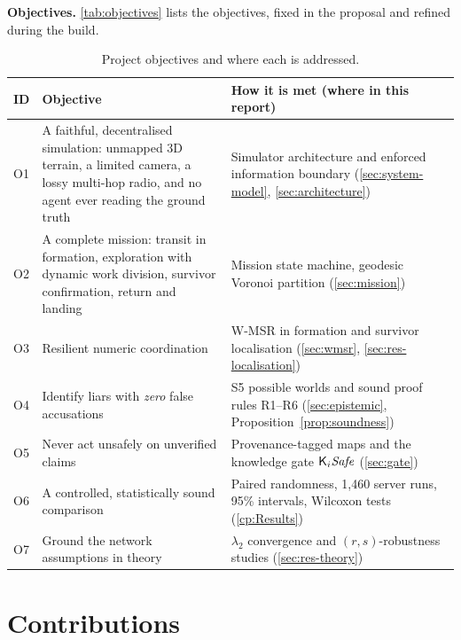 \textbf{Objectives.} \autoref{tab:objectives} lists the objectives, fixed in the proposal and refined during the build.

\begin{table}[h]
\centering
\renewcommand{\arraystretch}{1.25}
\begin{tabularx}{\linewidth}{@{}l X X@{}}
\toprule
\textbf{ID} & \textbf{Objective} & \textbf{How it is met (where in this report)} \\
\midrule
O1 & A faithful, decentralised simulation: unmapped 3D terrain, a limited camera, a lossy multi-hop radio, and no
     agent ever reading the ground truth & Simulator architecture and enforced information boundary
     (\autoref{sec:system-model}, \autoref{sec:architecture}) \\
O2 & A complete mission: transit in formation, exploration with dynamic work division, survivor confirmation, return
     and landing & Mission state machine, geodesic Voronoi partition (\autoref{sec:mission}) \\
O3 & Resilient numeric coordination & W-MSR in formation and survivor localisation
     (\autoref{sec:wmsr}, \autoref{sec:res-localisation}) \\
O4 & Identify liars with \emph{zero} false accusations & S5 possible worlds and sound proof rules R1--R6
     (\autoref{sec:epistemic}, Proposition~\ref{prop:soundness}) \\
O5 & Never act unsafely on unverified claims & Provenance-tagged maps and the knowledge gate
     $\mathsf{K}_i\mathit{Safe}$ (\autoref{sec:gate}) \\
O6 & A controlled, statistically sound comparison & Paired randomness, 1,460 server runs, 95\% intervals,
     Wilcoxon tests (\autoref{cp:Results}) \\
O7 & Ground the network assumptions in theory & $\lambda_2$ convergence and $(r,s)$-robustness studies
     (\autoref{sec:res-theory}) \\
\bottomrule
\end{tabularx}
\caption{Project objectives and where each is addressed.}
\label{tab:objectives}
\end{table}

\section{Contributions}
\label{sec:contributions-summary}

